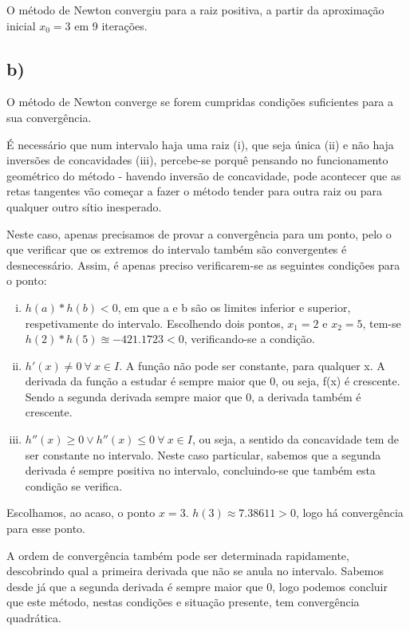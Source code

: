 \documentclass[a4paper, 18pt]{article}
\begin{document}
	\par
	O método de Newton convergiu para a raiz positiva, a partir da aproximação inicial $x_0 = 3$ em 9 iterações.

\subsection*{b)}
	\par
	O método de Newton converge se forem cumpridas condições suficientes para a sua convergência.

	\par
	É necessário que num intervalo haja uma raiz (i), que seja única (ii) e não haja inversões de concavidades (iii),
	percebe-se porquê pensando no funcionamento geométrico do método - havendo inversão de concavidade, pode
	acontecer que as retas tangentes vão começar a fazer o método tender para outra raiz ou para qualquer outro sítio inesperado.

	Neste caso, apenas precisamos de provar a convergência para um ponto, pelo o que verificar que os extremos do intervalo também são convergentes é desnecessário. Assim, é apenas preciso verificarem-se as seguintes condições para o ponto:

	\begin{enumerate}[i)]
	\item $h(a)*h(b) < 0$, em que a e b são os limites inferior e superior, respetivamente do intervalo.
	Escolhendo dois pontos, $x_1 = 2$ e $x_2 = 5$, tem-se $h(2) * h(5) \approxeq -421.1723 < 0 $, verificando-se a condição.

	\item $h'(x) \neq 0 \> \forall \> x \in I$. A função não pode ser constante, para qualquer x.
	A derivada da função a estudar é sempre maior que 0, ou seja, f(x) é crescente. Sendo a segunda derivada sempre maior que 0, a derivada também é crescente.

	\item $h''(x) \geqslant 0 \vee h''(x) \leqslant 0 \> \forall \> x \in I$, ou seja, a sentido da concavidade tem de ser constante no intervalo.
	Neste caso particular, sabemos que a segunda derivada é sempre positiva no intervalo, concluindo-se que também esta condição se verifica.
	\end{enumerate}

	Escolhamos, ao acaso, o ponto $x = 3$. $h(3) \approx 7.38611 > 0$, logo há convergência para esse ponto.

	A ordem de convergência também pode ser determinada rapidamente, descobrindo qual a primeira derivada que não se anula no intervalo. Sabemos desde já que a segunda derivada é sempre maior que 0, logo podemos concluir que este método, nestas condições e situação presente, tem convergência quadrática.
\end{document}
